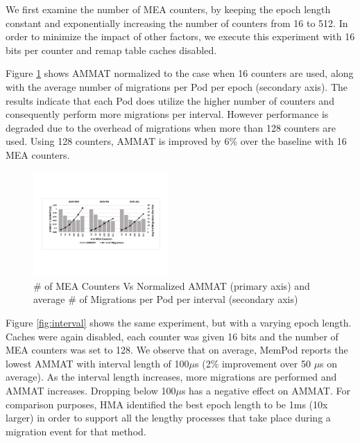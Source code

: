 
We first examine the number of MEA counters, by keeping the epoch length constant and exponentially increasing the number of counters from 16 to 512. In order to minimize the impact of other factors, we execute this experiment with 16 bits per counter and remap table caches disabled. 

Figure \ref{fig:num_counters} shows AMMAT normalized to the case when 16 counters are used, along with the average number of migrations per Pod per epoch (secondary axis). The results indicate that each Pod does utilize the higher number of counters and consequently perform more migrations per interval. However performance is degraded due to the overhead of migrations when more than 128 counters are used. Using 128 counters, AMMAT is improved by 6\% over the baseline with 16 MEA counters. 

\begin{figure}[h]
	\centering
  \includegraphics[width=0.46\textwidth]{figures/avg_num_counters_normalized.pdf}
  \caption{\# of MEA Counters Vs Normalized AMMAT (primary axis) and average \# of Migrations per Pod per interval (secondary axis)}
  \label{fig:num_counters}
\end{figure}

Figure \ref{fig:interval} shows the same experiment, but with a varying epoch length. Caches were again disabled, each counter was given 16 bits and the number of MEA counters was set to 128. We observe that on average, MemPod reports the lowest AMMAT with interval length of 100$\mu$s (2\% improvement over 50 $\mu$s on average). As the interval length increases, more migrations are performed and AMMAT increases. Dropping below 100$\mu$s has a negative effect on AMMAT. For comparison purposes, HMA \cite{meswani-HPCA21} identified the best epoch length to be 1ms (10x larger) in order to support all the lengthy processes that take place during a migration event for that method.

